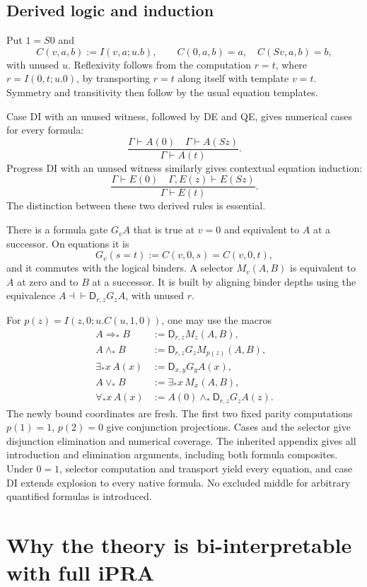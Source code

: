 \documentclass[11pt,letterpaper]{article}
\theoremstyle{definition}\newtheorem{definition}[theorem]{Definition}
\theoremstyle{remark}\newtheorem{remark}[theorem]{Remark}
\newcommand{\D}{\mathsf D}
\begin{document}
\subsection{Derived logic and induction}

Put $1=S0$ and
\[
 C(v,a,b):=I(v,a;u.b),\qquad
 C(0,a,b)=a,\quad C(Sv,a,b)=b,
\]
with unused $u$. Reflexivity follows from the computation
$r=t$, where $r=I(0,t;u.0)$, by transporting $r=t$ along itself with
template $v=t$. Symmetry and transitivity then follow by the usual
equation templates.

Case DI with an unused witness, followed by DE and QE, gives numerical
cases for every formula:
\[
 \frac{\Gamma\vdash A(0)\quad\Gamma\vdash A(Sz)}
      {\Gamma\vdash A(t)}.
\]
Progress DI with an unused witness similarly gives contextual equation
induction:
\[
 \frac{\Gamma\vdash E(0)\quad\Gamma,E(z)\vdash E(Sz)}
      {\Gamma\vdash E(t)}.
\]
The distinction between these two derived rules is essential.

There is a formula gate $G_vA$ that is true at $v=0$ and equivalent to
$A$ at a successor. On equations it is
\[
 G_v(s=t):=C(v,0,s)=C(v,0,t),
\]
and it commutes with the logical binders. A selector $M_v(A,B)$ is
equivalent to $A$ at zero and to $B$ at a successor. It is built by
aligning binder depths using the equivalence
$A\dashv\vdash\D_{r,z}G_zA$, with unused $r$.

For $p(z)=I(z,0;u.C(u,1,0))$, one may use the macros
\begin{align*}
 A\Rightarrow_*B&:=\D_{r,z}M_z(A,B),\\
 A\wedge_*B&:=\D_{r,z}G_zM_{p(z)}(A,B),\\
 \exists_*x\,A(x)&:=\D_{x,y}G_yA(x),\\
 A\vee_*B&:=\exists_*x\,M_x(A,B),\\
 \forall_*x\,A(x)&:=A(0)\wedge_*\D_{r,z}G_zA(z).
\end{align*}
The newly bound coordinates are fresh. The first two fixed parity
computations $p(1)=1$, $p(2)=0$ give conjunction projections. Cases and
the selector give disjunction elimination and numerical coverage.
The inherited appendix gives all introduction and elimination arguments,
including both formula composites. Under $0=1$, selector computation and
transport yield every equation, and case DI extends explosion to every
native formula. No excluded middle for arbitrary quantified formulas is
introduced.

\section{Why the theory is bi-interpretable with full iPRA}
\label{sec:bridge-main}
\end{document}

